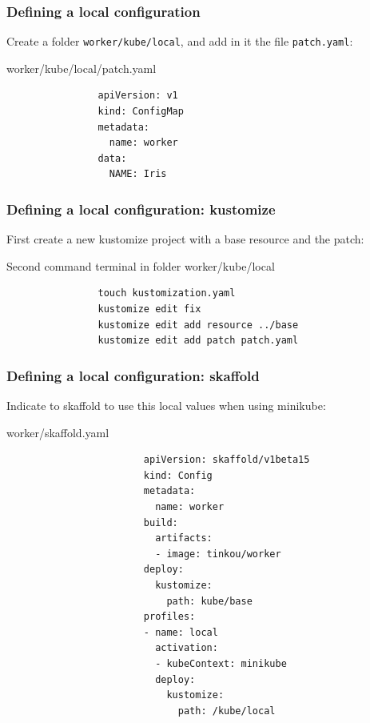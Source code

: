 	\begin{frame}[fragile]
		\frametitle{Defining a local configuration}
		
		Create a folder \verb!worker/kube/local!, and add in it the file \verb!patch.yaml!:
		\begin{block}{worker/kube/local/patch.yaml}
			\begin{verbatim}
				apiVersion: v1
				kind: ConfigMap
				metadata:
				  name: worker
				data:
				  NAME: Iris
			\end{verbatim}
		\end{block}
		
		\medskip
		
	\end{frame}
	
	\begin{frame}[fragile]
		\frametitle{Defining a local configuration: kustomize}
		
		First create a new kustomize project with a base resource and the patch:
		\begin{block}{Second command terminal in folder worker/kube/local}
			\begin{verbatim}
				touch kustomization.yaml
				kustomize edit fix
				kustomize edit add resource ../base
				kustomize edit add patch patch.yaml
			\end{verbatim}
		\end{block}
		
	\end{frame}
	
	\begin{frame}[fragile]
		\frametitle{Defining a local configuration: skaffold}
		
		Indicate to skaffold to use this local values when using minikube:
		\begin{block}{worker/skaffold.yaml}
			\begin{tiny}
				\begin{verbatim}
						apiVersion: skaffold/v1beta15
						kind: Config
						metadata:
						  name: worker
						build:
						  artifacts:
						  - image: tinkou/worker
						deploy:
						  kustomize:
						    path: kube/base
						profiles:
						- name: local
						  activation:
						  - kubeContext: minikube
						  deploy:
						    kustomize:
						      path: /kube/local
				\end{verbatim}
			\end{tiny}
		\end{block}
	
	\end{frame}
	
